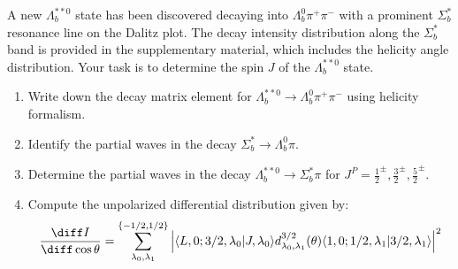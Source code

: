 A new $\Lambda_b^{**0}$ state has been discovered decaying into $\Lambda_b^0 \pi^+ \pi^-$ with a prominent $\Sigma_b^*$ resonance line on the Dalitz plot. The decay intensity distribution along the $\Sigma_b^*$ band is provided in the supplementary material, which includes the helicity angle distribution. Your task is to determine the spin $J$ of the $\Lambda_b^{**0}$ state.

\begin{enumerate}
    \item Write down the decay matrix element for $\Lambda_b^{**0} \to \Lambda_b^0 \pi^+ \pi^-$ using helicity formalism.
    \item Identify the partial waves in the decay $\Sigma_b^* \to \Lambda_b^0 \pi$.
    \item Determine the partial waves in the decay $\Lambda_b^{**0} \to \Sigma_b^* \pi$ for $J^P = \frac{1}{2}^\pm, \frac{3}{2}^\pm, \frac{5}{2}^\pm$.
    \item Compute the unpolarized differential distribution given by:
          $$
              \frac{\diff I}{\diff \cos \theta} = \sum_{\lambda_0, \lambda_1}^{\{-1/2,1/2\}} \left| \langle L, 0; 3/2, \lambda_0 | J, \lambda_0 \rangle d^{3/2}_{\lambda_0, \lambda_1}(\theta) \langle 1, 0; 1/2, \lambda_1 | 3/2, \lambda_1 \rangle \right|^2
          $$
\end{enumerate}